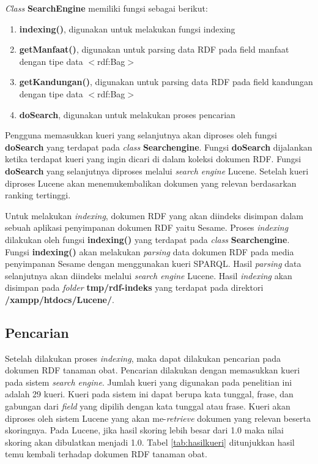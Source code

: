 \textit{Class} \textbf{Search\textunderscore Engine} memiliki fungsi sebagai berikut:
\begin{enumerate}[noitemsep] 
\item \textbf{indexing()}, digunakan untuk melakukan fungsi indexing
\item \textbf{getManfaat()}, digunakan untuk parsing data RDF pada field manfaat dengan tipe data $<$rdf:Bag$>$
\item \textbf{getKandungan()}, digunakan untuk parsing data RDF pada field kandungan
dengan tipe data $<$rdf:Bag$>$
\item \textbf{doSearch}, digunakan untuk melakukan proses pencarian
\end{enumerate}

Pengguna memasukkan kueri yang selanjutnya akan diproses oleh fungsi \textbf{doSearch} yang terdapat pada \textit{class} \textbf{Search\textunderscore engine}. Fungsi \textbf{doSearch} dijalankan ketika terdapat kueri yang ingin dicari di dalam koleksi dokumen RDF. Fungsi \textbf{doSearch} yang selanjutnya diproses melalui \textit{search engine} Lucene. Setelah kueri diproses Lucene akan menemukembalikan dokumen yang relevan berdasarkan ranking tertinggi.

Untuk melakukan \textit{indexing}, dokumen RDF yang akan diindeks disimpan dalam sebuah aplikasi penyimpanan dokumen RDF yaitu Sesame. Proses \textit{indexing} dilakukan oleh fungsi \textbf{indexing()} yang terdapat pada \textit{class} \textbf{Search\textunderscore engine}. Fungsi \textbf{indexing()} akan melakukan \textit{parsing} data dokumen RDF pada media penyimpanan Sesame dengan menggunakan kueri SPARQL. Hasil \textit{parsing} data selanjutnya akan diindeks melalui \textit{search engine} Lucene. Hasil \textit{indexing} akan disimpan pada \textit{folder} \textbf{tmp/rdf-indeks} yang terdapat pada direktori \textbf{/xampp/htdocs/Lucene/}.

\subsection*{Pencarian}
Setelah dilakukan proses \textit{indexing}, maka dapat dilakukan pencarian pada dokumen RDF tanaman obat. Pencarian dilakukan dengan memasukkan kueri pada sistem \textit{search engine}. Jumlah kueri yang digunakan pada penelitian ini adalah 29 kueri. Kueri pada sistem ini dapat berupa kata tunggal, frase, dan gabungan dari \textit{field} yang dipilih dengan kata tunggal atau frase. Kueri akan diproses oleh sistem Lucene yang akan me-\textit{retrieve} dokumen yang relevan beserta skoringnya. Pada Lucene, jika hasil skoring lebih besar dari 1.0 maka nilai skoring akan dibulatkan menjadi 1.0. Tabel \ref{tab:hasilkueri} ditunjukkan hasil temu kembali terhadap dokumen RDF tanaman obat.

